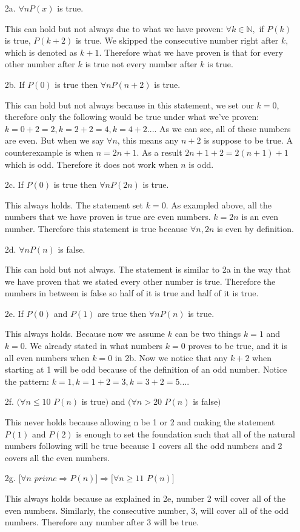 \documentclass[11pt,letterpaper]{article}
\begin{document}
\begin{enumerate}
	\item[2a.] $\forall n P(x)$ is true. 
	
	This can hold but not always due to what we have proven: $\forall k \in \mathbb{N},$ if $P(k)$ is true, $P(k+2)$ is true. We skipped the consecutive number right after $k$, which is denoted as $k+1$. Therefore what we have proven is that for every other number after $k$ is true not every number after $k$ is true.
	\item[2b.] If $P(0)$ is true then $\forall n P(n+2)$ is true.
	
	This can hold but not always because in this statement, we set our $k = 0$, therefore only the following would be true under what we've proven: $k = 0 + 2 = 2, k = 2 + 2 = 4, k = 4 + 2...$. As we can see, all of these numbers are even. But when we say $\forall n$, this means any $n + 2$ is suppose to be true. A counterexample is when $n = 2n + 1$. As a result $2n + 1 + 2 = 2(n + 1) + 1$ which is odd. Therefore it does not work when $n$ is odd.
	\item[2c.] If $P(0)$ is true then $\forall n P(2n)$ is true. 
	
	This always holds. The statement set $k = 0$. As exampled above, all the numbers that we have proven is true are even numbers. $k = 2n$ is an even number. Therefore this statement is true because $\forall n, 2n$ is even by definition.
	\item[2d.] $\forall n P(n)$ is false.
	
	This can hold but not always. The statement is similar to 2a in the way that we have proven that we stated every other number is true. Therefore the numbers in between is false so half of it is true and half of it is true. 
	\item[2e.]If $P(0)$ and $P(1)$ are true then $\forall n P(n)$ is true.
	
	This always holds. Because now we assume $k$ can be two things $k = 1$ and $k = 0$. We already stated in what numbers $k = 0$ proves to be true, and it is all even numbers when $k = 0$ in 2b. Now we notice that any $k + 2$ when starting at 1 will be odd because of the definition of an odd number. Notice the pattern: $k = 1, k = 1 + 2 = 3, k = 3 + 2 = 5...$.
	\item[2f.] $(\forall n \leq 10$ $P(n)$ is true$)$ and $(\forall n > 20$ $P(n)$ is false$)$ 
	
	This never holds because allowing n be 1 or 2 and making the statement $P(1)$ and $P(2)$ is enough to set the foundation such that all of the natural numbers following will be true because 1 covers all the odd numbers and 2 covers all the even numbers.
	\item[2g.] $[\forall n$ $prime \Rightarrow P(n)] \Rightarrow [\forall n \geq 11$ $P(n)]$
	
	This always holds because as explained in 2e, number 2 will cover all of the even numbers. Similarly, the consecutive number, 3, will cover all of the odd numbers. Therefore any number after 3 will be true. 
\end{enumerate}
\end{document}

